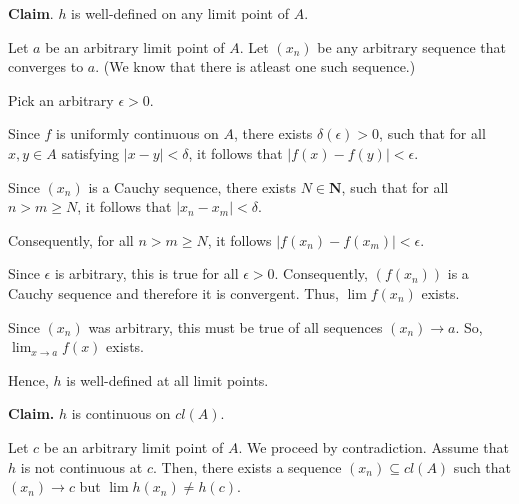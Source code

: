 \documentclass[10pt]{article}
\begin{document}
\textbf{Claim}. $\displaystyle h$ is well-defined on any limit point of $\displaystyle A$.



Let $\displaystyle a$ be an arbitrary limit point of $\displaystyle A$. Let $\displaystyle ( x_{n})$ be any arbitrary sequence that converges to $\displaystyle a$. (We know that there is atleast one such sequence.)



Pick an arbitrary $\displaystyle \epsilon  >0$. 



Since $\displaystyle f$ is uniformly continuous on $\displaystyle A$, there exists $\displaystyle \delta ( \epsilon )  >0$, such that for all $\displaystyle x,y\in A$ satisfying $\displaystyle |x-y|< \delta $, it follows that $\displaystyle |f( x) -f( y) |< \epsilon $.



Since $\displaystyle ( x_{n})$ is a Cauchy sequence, there exists $\displaystyle N\in \mathbf{N}$, such that for all $\displaystyle n >m\geq N$, it follows that $\displaystyle |x_{n} -x_{m} |< \delta $.



Consequently, for all $\displaystyle n >m\geq N$, it follows $\displaystyle |f( x_{n}) -f( x_{m}) |< \epsilon $. 



Since $\displaystyle \epsilon $ is arbitrary, this is true for all $\displaystyle \epsilon  >0$. Consequently, $\displaystyle ( f( x_{n}))$ is a Cauchy sequence and therefore it is convergent. Thus, $\displaystyle \lim f( x_{n})$ exists.



Since $\displaystyle ( x_{n})$ was arbitrary, this must be true of all sequences $\displaystyle ( x_{n})\rightarrow a$. So, $ $$\displaystyle \lim _{x\rightarrow a} f( x)$ exists.

Hence, $\displaystyle h$ is well-defined at all limit points.



\textbf{Claim. }$\displaystyle h$ is continuous on $\displaystyle cl( A)$.



Let $\displaystyle c$ be an arbitrary limit point of $\displaystyle A$. We proceed by contradiction. Assume that $\displaystyle h$ is not continuous at $\displaystyle c$. Then, there exists a sequence $\displaystyle ( x_{n}) \subseteq cl( A)$ such that $\displaystyle ( x_{n})\rightarrow c$ but $\displaystyle \lim h( x_{n}) \neq h( c)$. 
\end{document}
